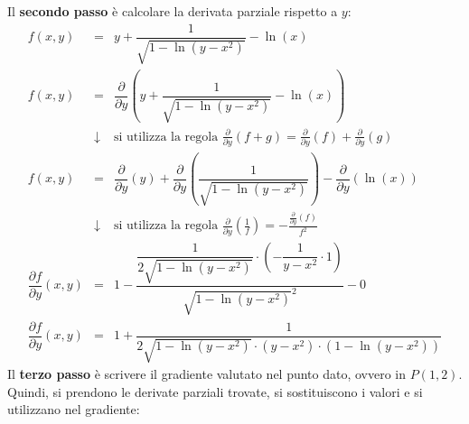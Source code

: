 \documentclass[a4paper]{article}
\begin{document}
	\nointerlineskip
	Il \textbf{secondo passo} è calcolare la derivata parziale rispetto a $y$:
	\begin{equation*}
		\begin{array}{rcl}
			f\left(x,y\right) &=& y + \dfrac{1}{\sqrt{1 - \ln\left(y - x^{2}\right)}} - \ln\left(x\right) \\ [1.5em]
			f\left(x,y\right) &=& \dfrac{\partial}{\partial y} \left( y + \dfrac{1}{\sqrt{1 - \ln\left(y - x^{2}\right)}} - \ln\left(x\right) \right) \\ [2em]
			&\downarrow& \text{si utilizza la regola } \frac{\partial}{\partial y}\left(f+g\right) = \frac{\partial}{\partial y}\left(f\right) + \frac{\partial}{\partial y}\left(g\right) \\ [1em]
			f\left(x,y\right) &=& \dfrac{\partial}{\partial y} \left(y\right) + \dfrac{\partial}{\partial y} \left(\dfrac{1}{\sqrt{1 - \ln\left(y - x^{2}\right)}}\right) - \dfrac{\partial}{\partial y}\left(\ln\left(x\right)\right) \\ [1.5em]
			&\downarrow& \text{si utilizza la regola } \frac{\partial}{\partial y}\left(\frac{1}{f}\right) = -\frac{\frac{\partial}{\partial y}\left(f\right)}{f^{2}} \\ [1em]
			\dfrac{\partial f}{\partial y}\left(x,y\right) &=& 1 - \dfrac{\dfrac{1}{2\sqrt{1-\ln\left(y-x^{2}\right)}} \cdot \left(-\dfrac{1}{y-x^{2}} \cdot 1\right)}{\sqrt{1-\ln\left(y-x^{2}\right)}^{2}} - 0 \\ [2em]
			\dfrac{\partial f}{\partial y}\left(x,y\right) &=& 1 + \dfrac{1}{2\sqrt{1-\ln\left(y-x^{2}\right)} \cdot \left(y-x^{2}\right) \cdot \left(1-\ln\left(y-x^{2}\right)\right)}
		\end{array}
	\end{equation*}
	Il \textbf{terzo passo} è scrivere il gradiente valutato nel punto dato, ovvero in $P\left(1,2\right)$. Quindi, si prendono le derivate parziali trovate, si sostituiscono i valori e si utilizzano nel gradiente:
\end{document}
